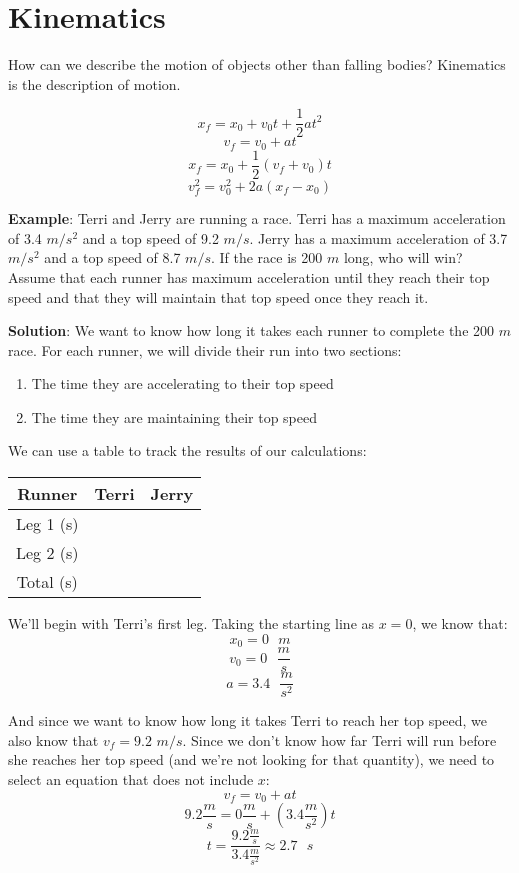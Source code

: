 \chapter{Kinematics}

How can we describe the motion of objects other than falling bodies? Kinematics 
is the description of motion. 


\begin{mdframed}[style = important]
$$x_f = x_0 + v_0 t + \frac{1}{2}at^2$$
$$v_f = v_0 + at$$
$$x_f = x_0 + \frac{1}{2}\left(v_f + v_0 \right)t$$
$$v_f^2 = v_0^2 + 2a\left(x_f - x_0 \right)$$
\end{mdframed}

\textbf{Example}: Terri and Jerry are running a race. Terri has a maximum 
acceleration of 3.4 $m/s^2$ and a top speed of 9.2 $m/s$. Jerry has a maximum 
acceleration of 3.7 $m/s^2$ and a top speed of 8.7 $m/s$. If the race is 200 $m$ 
long, who will win? Assume that each runner has maximum acceleration until they 
reach their top speed and that they will maintain that top speed once they reach 
it. 

\textbf{Solution}: We want to know how long it takes each runner to complete the 
200 $m$ race. For each runner, we will divide their run into two sections:
\begin{enumerate}
\item The time they are accelerating to their top speed
\item The time they are maintaining their top speed
\end{enumerate}

We can use a table to track the results of our calculations:
\begin{center}
\begin{tabular}{|c|c|c|}
\hline
Runner & Terri & Jerry\\\hline
Leg 1 (s) & & \\\hline
Leg 2 (s) & & \\\hline
Total (s) & & \\\hline
\end{tabular}
\end{center}

We'll begin with Terri's first leg. Taking the starting line as $x = 0$, we know 
that:
$$x_0 = 0\text{ }m$$
$$v_0 = 0\text { } \frac{m}{s}$$
$$a = 3.4\text{ }\frac{m}{s^2}$$

And since we want to know how long it takes Terri to reach her top speed, we 
also know that $v_f = 9.2$ $m/s$. Since we don't know how far Terri will run 
before she reaches her top speed (and we're not looking for that quantity), we 
need to select an equation that does not include $x$:
$$v_f = v_0 + at$$
$$9.2 \frac{m}{s} = 0 \frac{m}{s} + \left(3.4 \frac{m}{s^2} \right)t$$
$$t = \frac{9.2 \frac{m}{s}}{3.4 \frac{m}{s^2}} \approx 2.7\text{ }s$$

